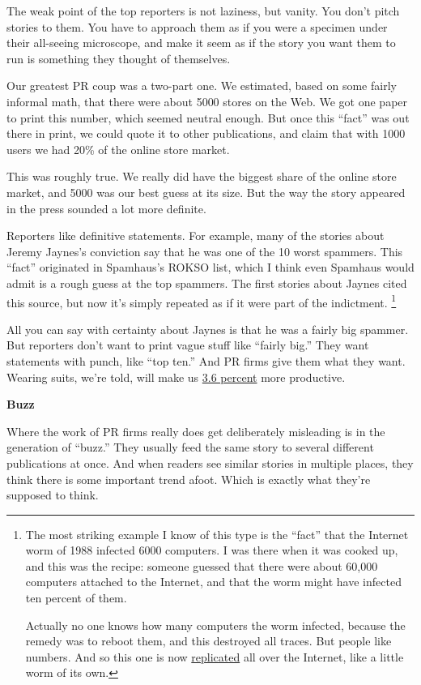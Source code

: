 The weak point of the top reporters is not laziness, but vanity. You
don't pitch stories to them. You have to approach them as if you were a
specimen under their all-seeing microscope, and make it seem as if the
story you want them to run is something they thought of themselves.

Our greatest PR coup was a two-part one. We estimated, based on some
fairly informal math, that there were about 5000 stores on the Web. We
got one paper to print this number, which seemed neutral enough. But
once this ``fact'' was out there in print, we could quote it to other
publications, and claim that with 1000 users we had 20\% of the online
store market.

This was roughly true. We really did have the biggest share of the
online store market, and 5000 was our best guess at its size. But the
way the story appeared in the press sounded a lot more definite.

Reporters like definitive statements. For example, many of the stories
about Jeremy Jaynes's conviction say that he was one of the 10 worst
spammers. This ``fact'' originated in Spamhaus's ROKSO list, which I
think even Spamhaus would admit is a rough guess at the top spammers.
The first stories about Jaynes cited this source, but now it's simply
repeated as if it were part of the indictment. \footnote{The most striking example I know of this type is the ``fact''
that the Internet worm of 1988 infected 6000 computers. I was there when
it was cooked up, and this was the recipe: someone guessed that there
were about 60,000 computers attached to the Internet, and that the worm
might have infected ten percent of them.

Actually no one knows how many computers the worm infected, because the
remedy was to reboot them, and this destroyed all traces. But people
like numbers. And so this one is now
\href{http://www.google.com/search?q=internet+worm+1988+6000}{replicated}
all over the Internet, like a little worm of its own.}

All you can say with certainty about Jaynes is that he was a fairly big
spammer. But reporters don't want to print vague stuff like ``fairly
big.'' They want statements with punch, like ``top ten.'' And PR firms
give them what they want. Wearing suits, we're told, will make us
\href{http://sanfrancisco.bizjournals.com/sanfrancisco/stories/2002/02/25/story5.html?t=printable}{3.6
percent} more productive.

\textbf{Buzz}

Where the work of PR firms really does get deliberately misleading is in
the generation of ``buzz.'' They usually feed the same story to several
different publications at once. And when readers see similar stories in
multiple places, they think there is some important trend afoot. Which
is exactly what they're supposed to think.

